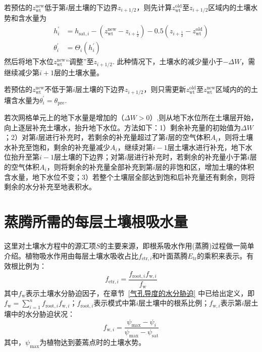 若预估的$z_{\mathrm{wt}}^{\mathrm{new}}$低于第$i$层土壤的下边界$z_{i+1/2}$，则先计算$z_{\mathrm{wt}}^{\mathrm{old}}$至$z_{i+1/2}$区域内的土壤水势和含水量为
\begin{equation} \label{formula:adjust_zwt1}
  \begin{aligned}
    h_i^{\prime} & = h_{\mathrm{sat},i} - \left(z_{\mathrm{wt}}^{\mathrm{new}} - z_{i+\frac{1}{2}}\right) -0.5\left( z_{i+\frac{1}{2}} - z_{\mathrm{wt}}^{\mathrm{old}}\right) \\
    \theta_i^{\prime} & = \Theta_i\left(h_i^{\prime}\right)
  \end{aligned}
\end{equation}
然后将地下水位$z_{\mathrm{wt}}^{\mathrm{new}}$“调整”至$z_{i+1/2}$. 此种情况下，土壤水的减少量小于$- \Delta W$，需继续减少第$i+1$层的土壤水量。

若预估的$z_{\mathrm{wt}}^{\mathrm{new}}$不低于第$i$层土壤的下边界$z_{i+1/2}$，则只需更新$z_{\mathrm{wt}}^{\mathrm{old}}$至$z_{\mathrm{wt}}^{\mathrm{new}}$区域内的的土壤含水量为$\theta_i^{\prime} = \theta_{\mathrm{pre}}$.


若次网格单元上的地下水量是增加的（$\Delta W > 0$）,则从地下水位所在土壤层开始，向上逐层补充土壤水，抬升地下水位。方法如下：1）剩余补充量的初始值为$\Delta W$；2）对第$i$层进行补充时，若剩余的补充量超过了第$i$层的空气体积$A_i$，则将土壤水补充至饱和，剩余的补充量减少$A_i$，继续对第$i-1$层土壤水进行补充，地下水位抬升至第$i-1$层土壤的下边界；对第$i$层进行补充时，若剩余的补充量小于第$i$层的空气体积$A_i$，则将剩余的补充量全部补充到第$i$层的非饱和区，增加土壤的体积含水量，地下水位不变；3）若整个土壤层全部达到饱和后补充量还有剩余，则将剩余的水分补充至地表积水。



\section{蒸腾所需的每层土壤根吸水量}

这里对土壤水方程中的源汇项$S$的主要来源，即根系吸水作用(蒸腾)过程做一简单介绍。植物吸水作用由每层土壤水吸收占比$f_{\mathrm{etr},i}$和叶面蒸腾$E_{\mathrm{tr}}$的乘积来表示\citep{dai2003common}。有效根比例为：
\begin{equation}
  {f}_{\mathrm{ {etr }}, {i}}=\frac{{f}_{\mathrm{{root}}, {i}} {f}_{\mathrm{w},i}}{f_{\mathrm{w}}}
\end{equation}
其中$f_{\mathrm{w}}$表示土壤水分胁迫因子，在章节~\ref{气孔导度的水分胁迫} 中已给出定义，即$f_{\mathrm{w}} = \sum_{i=1}^{n}{f_{\mathrm{root},i}}f_{\mathrm{w},i}$；$f_{\mathrm{root},i}$表示模式中第$i$层土壤中的根系比例；$f_{\mathrm{w},i}$表示第$i$层土壤中的水分胁迫状况：
\begin{equation}
  {f}_{\mathrm{w},i}=\frac{\psi_{\max }-\psi_{i}}{\psi_{\max }-\psi_{\mathrm{sat}}}
\end{equation}
其中，$\psi_{\mathrm{max}}$为植物达到萎蔫点时的土壤水势。

